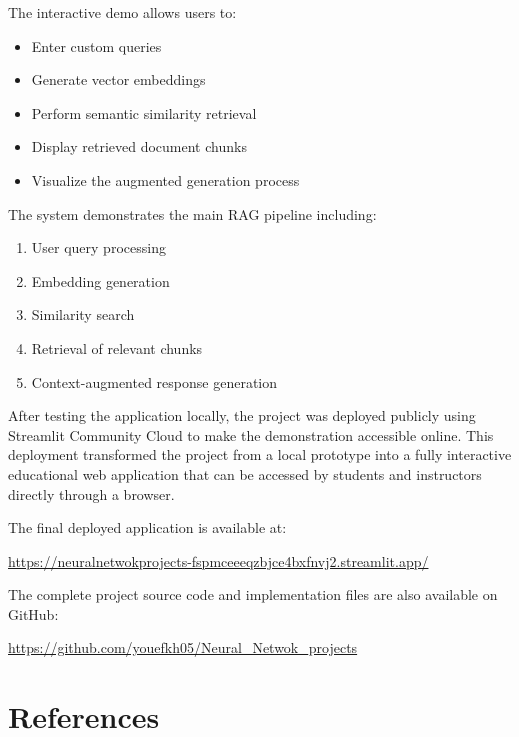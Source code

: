 \documentclass[12pt,a4paper]{article}
\begin{document}
The interactive demo allows users to:
\begin{itemize}
    \item Enter custom queries
    \item Generate vector embeddings
    \item Perform semantic similarity retrieval
    \item Display retrieved document chunks
    \item Visualize the augmented generation process
\end{itemize}

The system demonstrates the main RAG pipeline including:
\begin{enumerate}
    \item User query processing
    \item Embedding generation
    \item Similarity search
    \item Retrieval of relevant chunks
    \item Context-augmented response generation
\end{enumerate}

After testing the application locally, the project was deployed publicly using Streamlit Community Cloud to make the demonstration accessible online. This deployment transformed the project from a local prototype into a fully interactive educational web application that can be accessed by students and instructors directly through a browser.

The final deployed application is available at:

\begin{center}
\url{https://neuralnetwokprojects-fspmceeeqzbjce4bxfnvj2.streamlit.app/}
\end{center}

The complete project source code and implementation files are also available on GitHub:

\begin{center}
\url{https://github.com/youefkh05/Neural_Netwok_projects}
\end{center}


\section{References}
\end{document}
